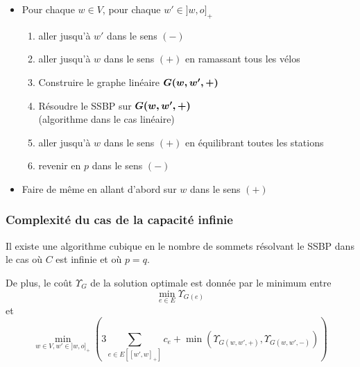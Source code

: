 \begin{frame}[label=AlgoCapaciteInfinie]
\begin{center}
\begin{minipage}[c]{\linewidth}
\begin{minipage}[c]{.2\linewidth}
\begin{overlayarea}{\textwidth}{\textheight}
        \end{overlayarea}
      \end{minipage}
      \begin{minipage}[c]{.8\linewidth}
        \begin{overlayarea}{\textwidth}{\textheight}
          \begin{itemize}
          \item<6-> Pour chaque $w \in V$, pour chaque $w' \in ]w,o]_+$
            \begin{enumerate}
            \item<7-> aller jusqu'à $w'$ dans le sens $(-)$
            \item<8-> aller jusqu'à $w$ dans le sens $(+)$ en ramassant tous les vélos
            \item<9-> Construire le graphe linéaire $\boldsymbol{G(w,w',+)}$
            \item<10-> Résoudre le SSBP sur $\boldsymbol{G(w,w',+)}$\\
            (algorithme dans le cas linéaire)
            \item<12-> aller jusqu'à $w$ dans le sens $(+)$ en équilibrant toutes les stations
            \item<13-> revenir en $p$ dans le sens $(-)$
            \end{enumerate}
          \item<14-> Faire de même en allant d'abord sur $w$ dans le sens $(+)$
          \end{itemize}
        \end{overlayarea}
      \end{minipage}
    \end{minipage}
  \end{center}
\end{frame}

\begin{frame}[label=OptimaliteCapaciteInfinie]
  \frametitle{Complexité du cas de la capacité infinie}

  \begin{thm} \label{thm: optimalité algo infini}
  Il existe une algorithme cubique en le nombre de sommets résolvant le SSBP dans le cas où $C$ est infinie et où $p=q$.

  De plus, le coût $\Upsilon_{G}$ de la solution optimale est donnée par le minimum entre
  $$
    \min_{e \in E} \Upsilon_{G(e)}
  $$
  et
  $$
    \min_{w \in V, w' \in ]w,o]_+}
    \left(
      3 \sum_{ e \in E\left[ \left[w',w\right]_+ \right] }c_e + \min \left( \Upsilon_{G(w,w',+)} , \Upsilon_{G(w,w',-)} \right)
    \right)
  $$
  \end{thm}
\end{frame}

